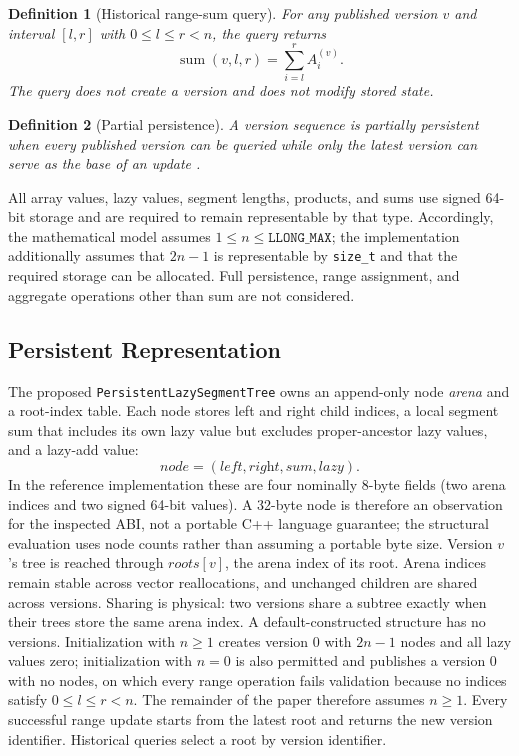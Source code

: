 \documentclass[conference]{IEEEtran}
\newtheorem{definition}{Definition}
\begin{document}
\begin{definition}[Historical range-sum query]
\label{def:query}
For any published version $v$ and interval $[l,r]$ with $0 \leq l \leq r < n$, the query
returns
\[
\operatorname{sum}(v,l,r) = \sum_{i=l}^{r} A^{(v)}_i .
\]
The query does not create a version and does not modify stored state.
\end{definition}

\begin{definition}[Partial persistence]
\label{def:persistence}
A version sequence is partially persistent when every published version can be queried while
only the latest version can serve as the base of an update \cite{driscoll1989persistent}.
\end{definition}

All array values, lazy values, segment lengths, products, and sums use signed 64-bit storage and
are required to remain representable by that type. Accordingly, the mathematical model assumes
$1 \leq n \leq \texttt{LLONG\_MAX}$; the implementation additionally assumes that $2n-1$ is
representable by \texttt{size\_t} and that the required storage can be allocated. Full
persistence, range assignment, and aggregate operations other than sum are not considered.

\subsection{Persistent Representation}
\label{sec:representation}

The proposed \texttt{PersistentLazySegmentTree} owns an append-only node \emph{arena} and a
root-index table. Each node stores left and right child indices, a local segment sum that includes
its own lazy value but excludes proper-ancestor lazy values, and a lazy-add value:
\[
\textit{node} = (\textit{left}, \textit{right}, \textit{sum}, \textit{lazy}).
\]
In the reference implementation these are four nominally 8-byte fields (two arena indices and two
signed 64-bit values). A 32-byte node is therefore an observation for the inspected ABI, not a
portable C++ language guarantee; the structural evaluation uses node counts rather than assuming
a portable byte size.
Version $v$'s tree is reached through $\textit{roots}[v]$, the arena index of its root. Arena
indices remain stable across vector reallocations, and unchanged children are shared across
versions. Sharing is physical: two versions share a subtree exactly when their trees store the
same arena index. A default-constructed structure has no versions. Initialization with
$n \geq 1$ creates version 0 with $2n-1$ nodes and all lazy values zero; initialization with
$n = 0$ is also permitted and publishes a version 0 with no nodes, on which every range
operation fails validation because no indices satisfy $0 \leq l \leq r < n$. The remainder of
the paper therefore assumes $n \geq 1$. Every successful range update starts from the latest root
and returns the new version identifier. Historical queries select a root by version identifier.
\end{document}
